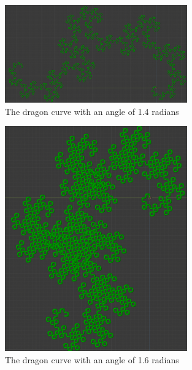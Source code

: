 \begin{figure}[h]
    \centering
    \includegraphics[width=0.7\textwidth]{figures/L-systems/dragon-1_4rad.png}
    \caption{The dragon curve with an angle of 1.4 radians}
\end{figure}

\begin{figure}[h]
    \centering
    \includegraphics[width=0.7\textwidth]{figures/L-systems/dragon-1_6rad.png}
    \caption{The dragon curve with an angle of 1.6 radians}
\end{figure}


